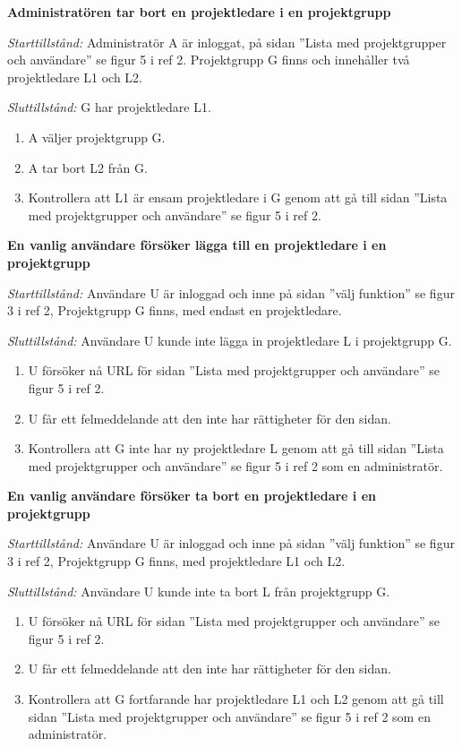 \documentclass[a4paper]{article}
\begin{document}
\begin{FT}
\item %
\textbf{Administratören tar bort en projektledare i en projektgrupp}

\emph{Starttillstånd:} Administratör A är inloggat, på sidan ''Lista med projektgrupper och användare'' se figur 5 i ref 2. Projektgrupp G finns och innehåller två projektledare L1 och L2.

\emph{Sluttillstånd:} G har projektledare L1.

\begin{enumerate}
\item A väljer projektgrupp G.
\item A tar bort L2 från G.
\item Kontrollera att L1 är ensam projektledare i G genom att gå till sidan ''Lista med projektgrupper och användare'' se figur 5 i ref 2.
\end{enumerate}

\item %
\textbf{En vanlig användare försöker lägga till en projektledare i en projektgrupp} 

\emph{Starttillstånd:} Användare U är inloggad och inne på sidan ''välj funktion'' se figur 3 i ref 2, Projektgrupp G finns, med endast en projektledare.

\emph{Sluttillstånd:} Användare U kunde inte lägga in projektledare L i projektgrupp G.

\begin{enumerate}
\item U försöker nå URL för sidan ''Lista med projektgrupper och användare'' se figur 5 i ref 2.
\item U får ett felmeddelande att den inte har rättigheter för den sidan. 
\item Kontrollera att G inte har ny projektledare L genom att gå till sidan ''Lista med projektgrupper och användare'' se figur 5 i ref 2 som en administratör.
\end{enumerate}

\item %
\textbf{En vanlig användare försöker ta bort en projektledare i en projektgrupp}

\emph{Starttillstånd:} Användare U är inloggad och inne på sidan ''välj funktion'' se figur 3 i ref 2, Projektgrupp G finns, med projektledare L1 och L2.

\emph{Sluttillstånd:} Användare U kunde inte ta bort L från projektgrupp G.

\begin{enumerate}
\item U försöker nå URL för sidan ''Lista med projektgrupper och användare'' se figur 5 i ref 2.
\item U får ett felmeddelande att den inte har rättigheter för den sidan. 
\item Kontrollera att G fortfarande har projektledare L1 och L2 genom att gå till sidan ''Lista med projektgrupper och användare'' se figur 5 i ref 2 som en administratör.
\end{enumerate}


\end{FT}
\end{document}
